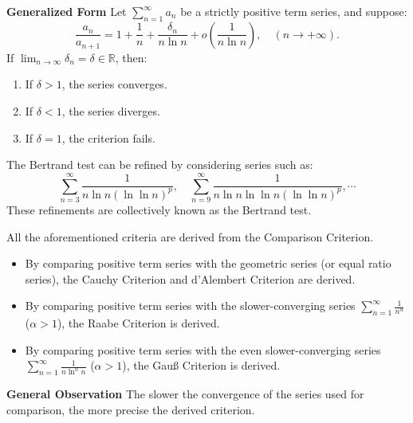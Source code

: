 \documentclass[11pt]{../../TexTemplate/elegantbook}
\begin{document}
\begin{theorem}
\begin{description}
        \textbf{Generalized Form}
        Let \( \sum_{n=1}^{\infty} a_n \) be a strictly positive term series, and suppose:
        \[
        \frac{a_n}{a_{n+1}} = 1 + \frac{1}{n} + \frac{\delta_n}{n \ln n} + o\left( \frac{1}{n \ln n} \right), 
        \quad (n \to +\infty).
        \]
        If \( \lim_{n \to \infty} \delta_n = \delta \in \mathbb{R} \), then:
        \begin{enumerate}
            \item If \( \delta > 1 \), the series converges.
            \item If \( \delta < 1 \), the series diverges.
            \item If \( \delta = 1 \), the criterion fails.
        \end{enumerate}
\end{description}
\end{theorem}

\begin{note}
    The Bertrand test can be refined by considering series such as:
    \[
    \sum_{n=3}^{\infty} \frac{1}{n \ln n (\ln \ln n)^p}, 
    \quad \sum_{n=9}^{\infty} \frac{1}{n \ln n \ln \ln n (\ln \ln n)^p}, 
    \cdots
    \]
    These refinements are collectively known as the Bertrand test.
\end{note}

\begin{remark}
    All the aforementioned criteria are derived from the Comparison Criterion.
    \begin{itemize}
        \item By comparing positive term series with the geometric series (or equal ratio series), 
            the Cauchy Criterion and d'Alembert Criterion are derived.
        \item By comparing positive term series with the slower-converging series 
            \( \sum_{n=1}^{\infty} \frac{1}{n^\alpha} \) (\( \alpha > 1 \)), the Raabe Criterion is derived.
        \item By comparing positive term series with the even slower-converging series 
            \( \sum_{n=1}^{\infty} \frac{1}{n \ln^\alpha n} \) (\( \alpha > 1 \)), the Gauß Criterion is derived.
    \end{itemize}
    \textbf{General Observation}
    The slower the convergence of the series used for comparison, the more precise the derived criterion.
\end{remark}
\end{document}
